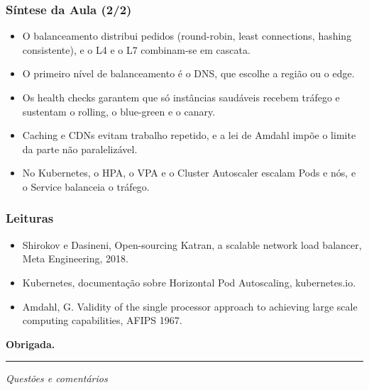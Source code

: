 \documentclass[aspectratio=169]{beamer}
\begin{document}
\begin{frame}
\frametitle{Síntese da Aula \textcolor{NudeTaupe}{\small(2/2)}}
\begin{itemize}
    \setlength\itemsep{0.35cm}
    \item O balanceamento distribui pedidos (round-robin, least connections, hashing consistente), e o L4 e o L7 combinam-se em cascata.
    \item O primeiro nível de balanceamento é o DNS, que escolhe a região ou o edge.
    \item Os health checks garantem que só instâncias saudáveis recebem tráfego e sustentam o rolling, o blue-green e o canary.
    \item Caching e CDNs evitam trabalho repetido, e a lei de Amdahl impõe o limite da parte não paralelizável.
    \item No Kubernetes, o HPA, o VPA e o Cluster Autoscaler escalam Pods e nós, e o Service balanceia o tráfego.
\end{itemize}
\end{frame}

\begin{frame}
\frametitle{Leituras}
\begin{itemize}
    \setlength\itemsep{0.4cm}
    \item Shirokov e Dasineni, Open-sourcing Katran, a scalable network load balancer, Meta Engineering, 2018.
    \item Kubernetes, documentação sobre Horizontal Pod Autoscaling, kubernetes.io.
    \item Amdahl, G. Validity of the single processor approach to achieving large scale computing capabilities, AFIPS 1967.
\end{itemize}
\end{frame}

\begin{frame}[plain]
  \vspace*{3cm}
  \begin{center}
    \Huge\bfseries\textcolor{TextEspresso}{Obrigada.}\par
    \vspace{0.5cm}
    {\color{NudeTaupe}\rule{2cm}{0.5pt}}\par
    \vspace{0.5cm}
    \Large\textcolor{TextEspresso}{\itshape Questões e comentários}
  \end{center}
\end{frame}
\end{document}
